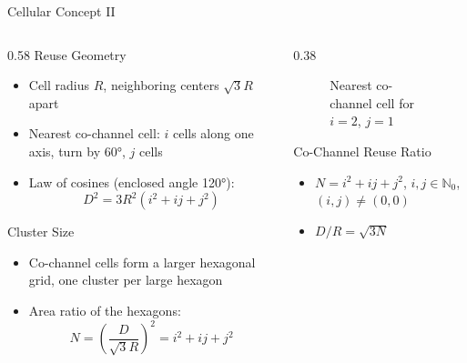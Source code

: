 \begin{frame}{Cellular Concept II}
  \begin{columns}[T,onlytextwidth]
    \begin{column}{0.58\textwidth}
      Reuse Geometry
      \begin{itemize}
        \item Cell radius $R$, neighboring centers $\sqrt{3}R$ apart
        \item Nearest co-channel cell: $i$ cells along one axis, turn by \ang{60}, $j$ cells
        \item Law of cosines (enclosed angle \ang{120}):
          \[ D^2 = 3R^2\left(i^2 + ij + j^2\right) \]
      \end{itemize}
      \vspace{0.4em}
      Cluster Size
      \begin{itemize}
        \item Co-channel cells form a larger hexagonal grid, one cluster per large hexagon
        \item Area ratio of the hexagons:
          \[ N = \left(\frac{D}{\sqrt{3}R}\right)^2 = i^2 + ij + j^2 \]
      \end{itemize}
    \end{column}
    \begin{column}{0.38\textwidth}
      \begin{figure}
        \centering
        
        \caption{Nearest co-channel cell for $i=2$, $j=1$}
      \end{figure}
      \begin{block}{Co-Channel Reuse Ratio}
        \begin{itemize}
          \item $N = i^2 + ij + j^2$, $i,j \in \mathbb{N}_0$, $(i,j) \neq (0,0)$
          \item $D/R = \sqrt{3N}$
        \end{itemize}
      \end{block}
    \end{column}
  \end{columns}
\end{frame}


